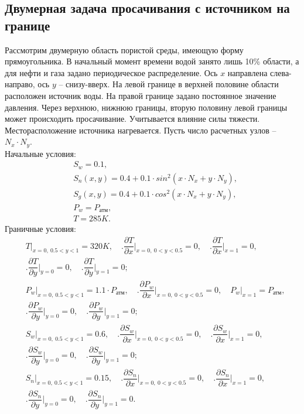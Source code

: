 
\subsection{Двумерная задача просачивания с источником на границе}
Рассмотрим двумерную область пористой среды, имеющую форму
прямоугольника. В начальный момент времени водой занято лишь
10\% области, а для нефти и газа задано периодическое распределение. Ось $x$ направлена слева-направо,
ось $y$ -- снизу-вверх. На левой границе в верхней половине области расположен источник воды.
На правой границе задано постоянное значение давления. Через верхнюю, нижнюю границы, вторую половину левой границы
может происходить просачивание. Учитывается влияние силы тяжести. Месторасположение источника нагревается. 
Пусть число расчетных узлов -- $N_x\cdot N_y$.\\
Начальные условия:
\begin{equation}
  \begin{aligned}
    &S_w=0.1,\\
    &S_n(x, y)=0.4 + 0.1 \cdot sin^2(x \cdot N_x + y \cdot N_y),\\
    &S_g(x, y)=0.4 + 0.1 \cdot cos^2(x \cdot N_x + y \cdot N_y),\\
    &P_w=P_\text{атм},\\
    &T=285K.
   \end{aligned}
\end{equation}
Граничные условия:
\begin{equation}
  \begin{aligned}
    &\left.T\right|_{x=0,\ 0.5 < y < 1}=320K,\quad \Biggl.\dfrac{\partial{T}}{\partial{x}}\Biggr|_{x=0,\ 0 < y < 0.5}=0,\quad \Biggl.\dfrac{\partial{T}}{\partial{x}}\Biggr|_{x=1}=0,\\
    &\Biggl.\dfrac{\partial{T}}{\partial{y}}\Biggr|_{y=0}=0,\quad \Biggl.\dfrac{\partial{T}}{\partial{y}}\Biggr|_{y=1}=0;\\
    &\left.P_w\right|_{x=0,\ 0.5 < y < 1}=1.1\cdot P_{\text{атм}},\quad \Biggl.\dfrac{\partial{P_w}}{\partial{x}}\Biggr|_{x=0,\ 0 < y < 0.5}=0,\quad \left.{P_w}\right|_{x=1}=P_{\text{атм}},\\
    &\Biggl.\dfrac{\partial{P_w}}{\partial{y}}\Biggr|_{y=0}=0,\quad \Biggl.\dfrac{\partial{P_w}}{\partial{y}}\Biggr|_{y=1}=0;\\
    &\left.S_w\right|_{x=0,\ 0.5 < y < 1}=0.6,\quad \Biggl.\dfrac{\partial{S_w}}{\partial{x}}\Biggr|_{x=0,\ 0 < y < 0.5}=0,\quad \Biggl.\dfrac{\partial{S_w}}{\partial{x}}\Biggr|_{x=1}=0,\\
    &\Biggl.\dfrac{\partial{S_w}}{\partial{y}}\Biggr|_{y=0}=0,\quad \Biggl.\dfrac{\partial{S_w}}{\partial{y}}\Biggr|_{y=1}=0;\\
    &\left.S_n\right|_{x=0,\ 0.5 < y < 1}=0.15,\quad \Biggl.\dfrac{\partial{S_n}}{\partial{x}}\Biggr|_{x=0,\ 0 < y < 0.5}=0,\quad \Biggl.\dfrac{\partial{S_n}}{\partial{x}}\Biggr|_{x=1}=0,\\
    &\Biggl.\dfrac{\partial{S_n}}{\partial{y}}\Biggr|_{y=0}=0,\quad \Biggl.\dfrac{\partial{S_n}}{\partial{y}}\Biggr|_{y=1}=0.
  \end{aligned}
\end{equation}


